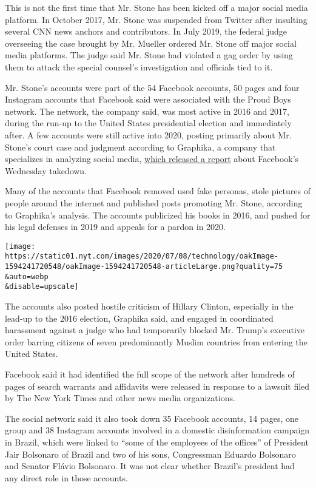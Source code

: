 This is not the first time that Mr. Stone has been kicked off a major
social media platform. In October 2017, Mr. Stone was suspended from
Twitter after insulting several CNN news anchors and contributors. In
July 2019, the federal judge overseeing the case brought by Mr. Mueller
ordered Mr. Stone off major social media platforms. The judge said Mr.
Stone had violated a gag order by using them to attack the special
counsel's investigation and officials tied to it.

Mr. Stone's accounts were part of the 54 Facebook accounts, 50 pages and
four Instagram accounts that Facebook said were associated with the
Proud Boys network. The network, the company said, was most active in
2016 and 2017, during the run-up to the United States presidential
election and immediately after. A few accounts were still active into
2020, posting primarily about Mr. Stone's court case and judgment
according to Graphika, a company that specializes in analyzing social
media,
\href{https://public-assets.graphika.com/reports/graphika_report_roger_stone_takedown.pdf}{which
released a report} about Facebook's Wednesday takedown.

Many of the accounts that Facebook removed used fake personas, stole
pictures of people around the internet and published posts promoting Mr.
Stone, according to Graphika's analysis. The accounts publicized his
books in 2016, and pushed for his legal defenses in 2019 and appeals for
a pardon in 2020.

\texttt{[image: https://static01.nyt.com/images/2020/07/08/technology/oakImage-1594241720548/oakImage-1594241720548-articleLarge.png?quality=75\\\&auto=webp\\\&disable=upscale]}

The accounts also posted hostile criticism of Hillary Clinton,
especially in the lead-up to the 2016 election, Graphika said, and
engaged in coordinated harassment against a judge who had temporarily
blocked Mr. Trump's executive order barring citizens of seven
predominantly Muslim countries from entering the United States.

Facebook said it had identified the full scope of the network after
hundreds of pages of search warrants and affidavits were released in
response to a lawsuit filed by The New York Times and other news media
organizations.

The social network said it also took down 35 Facebook accounts, 14
pages, one group and 38 Instagram accounts involved in a domestic
disinformation campaign in Brazil, which were linked to ``some of the
employees of the offices'' of President Jair Bolsonaro of Brazil and two
of his sons, Congressman Eduardo Bolsonaro and Senator Flávio Bolsonaro.
It was not clear whether Brazil's president had any direct role in those
accounts.

